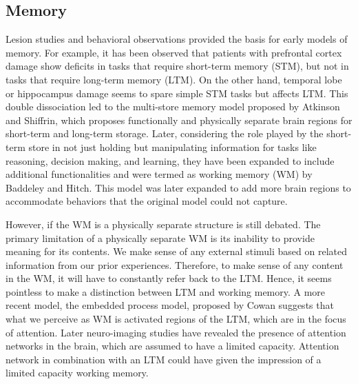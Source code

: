 \documentclass[reprint,amsmath,amssymb,apr,aip,onecolumn, 11pt]{revtex4-1}
\begin{document}
 

\subsection{Memory}

Lesion studies and behavioral observations provided the basis for early models of memory. For example, it has been observed that patients with prefrontal cortex damage show deficits in tasks that require short-term memory (STM), but not in tasks that require long-term memory (LTM). On the other hand, temporal lobe or hippocampus damage seems to spare simple STM tasks but affects LTM. This double dissociation led to the multi-store memory model proposed by Atkinson and Shiffrin\cite{ATKINSON1968}, which proposes functionally and physically separate brain regions for short-term and long-term storage. Later, considering the role played by the short-term store in not just holding but manipulating information for tasks like reasoning, decision making, and learning, they have been expanded to include additional functionalities and were termed as working memory (WM) by Baddeley and Hitch\cite{BADDELEY1974}.  This model was later expanded to add more brain regions to accommodate behaviors that the original model could not capture\cite{Baddeley_2000}. 

However, if the WM is a physically separate structure is still debated\cite{Raaijmakers_Shiffrin_2003}.
The primary limitation of a physically separate WM is its inability to provide meaning for its contents. We make sense of any external stimuli based on related information from our prior experiences. Therefore, to make sense of any content in the WM, it will have to constantly refer back to the LTM. Hence, it seems pointless to make a distinction between LTM and working memory. A more recent model, the embedded process model, proposed by Cowan\cite{Cowan1999,Cowan2021} suggests that what we perceive as WM is activated regions of the LTM, which are in the focus of attention. Later neuro-imaging studies have revealed the presence of attention networks in the brain, which are assumed to have a limited capacity. Attention network in combination with an LTM could have given the impression of a limited capacity working memory. 
 
\end{document}
